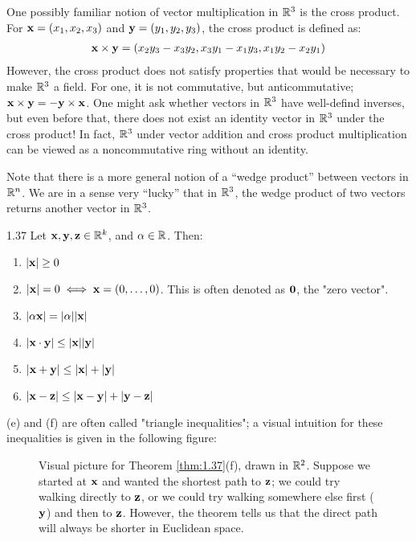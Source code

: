 One possibly familiar notion of vector multiplication in $\mathbb{R}^3$ is the cross product. For $\mathbf{x} = (x_1, x_2, x_3)$ and $\mathbf{y} = (y_1, y_2, y_3)$, the cross product is defined as:
\begin{align*}
    \mathbf{x} \times \mathbf{y} = (x_2y_3 - x_3y_2, x_3y_1 - x_1y_3, x_1y_2 - x_2y_1)
\end{align*}
However, the cross product does not satisfy properties that would be necessary to make $\mathbb{R}^3$ a field. For one, it is not commutative, but anticommutative; $\mathbf{x} \times \mathbf{y} = -\mathbf{y} \times \mathbf{x}$. One might ask whether vectors in $\mathbb{R}^3$ have well-defind inverses, but even before that, there does not exist an identity vector in $\mathbb{R}^3$ under the cross product! In fact, $\mathbb{R}^3$ under vector addition and cross product multiplication can be viewed as a noncommutative ring without an identity. 

Note that there is a more general notion of a ``wedge product'' between vectors in $\mathbb{R}^n$. We are in a sense very ``lucky'' that in $\mathbb{R}^3$, the wedge product of two vectors returns another vector in $\mathbb{R}^3$. 

\begin{theorem}{}{1.37}
    Let $\mathbf{x}, \mathbf{y}, \mathbf{z} \in \mathbb{R}^k$, and $\alpha \in \mathbb{R}$. Then:
    \begin{enumerate}
        \item $\abs{\mathbf{x}} \geq 0$
        \item $\abs{\mathbf{x}} = 0 \iff \mathbf{x} = (0, \ldots, 0)$. This is often denoted as $\mathbf{0}$, the "zero vector". 
        \item $\abs{\alpha\mathbf{x}} = \abs{\alpha}\abs{\mathbf{x}}$
        \item $\abs{\mathbf{x} \cdot \mathbf{y}} \leq \abs{\mathbf{x}}\abs{\mathbf{y}}$ 
        \item $\abs{\mathbf{x} + \mathbf{y}} \leq \abs{\mathbf{x}} + \abs{\mathbf{y}}$
        \item $\abs{\mathbf{x} - \mathbf{z}} \leq \abs{\mathbf{x} - \mathbf{y}} + \abs{\mathbf{y} - \mathbf{z}}$
    \end{enumerate}
\end{theorem}
\noindent (e) and (f) are often called "triangle inequalities"; a visual intuition for these inequalities is given in the following figure:
\begin{figure}[htbp]
    \centering
    \caption{Visual picture for Theorem \ref{thm:1.37}(f), drawn in $\mathbb{R}^2$. Suppose we started at $\mathbf{x}$ and wanted the shortest path to $\mathbf{z}$; we could try walking directly to $\mathbf{z}$, or we could try walking somewhere else first ($\mathbf{y}$) and then to $\mathbf{z}$. However, the theorem tells us that the direct path will always be shorter in Euclidean space.}
    \label{fig3}
\end{figure}

